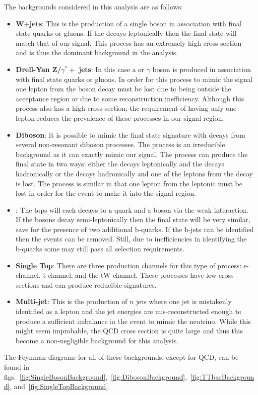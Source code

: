 The backgrounds considered in this analysis are as follows:
\begin{itemize}
	\item \textbf{W$+$jets}: This is the production of a single \Wpm boson in association with final state quarks or gluons. If the \Wpm decays leptonically then the final state will match that of our signal. This process has an extremely high cross section and is thus the dominant background in the analysis.
	\item \textbf{Drell-Yan Z/$\gamma^{*}+$ jets}: In this case a \Z or $\gamma$ boson is produced in association with final state quarks or gluons. In order for this process to mimic the signal one lepton from the boson decay must be lost due to being outside the acceptance region or due to some reconstruction inefficiency. Although this process also has a high cross section, the requirement of having only one lepton reduces the prevalence of these processes in our signal region.
	\item \textbf{Diboson}: It is possible to mimic the final state signature with decays from several non-resonant diboson processes. The \WW process is an irreducible background as it can exactly mimic our signal. The \WZ process can produce the \lvqq final state in two ways: either the \W decays leptonically and the \Z decays hadronically or the \W decays hadronically and one of the leptons from the \Z decay is lost. The \ZZ process is similar in that one lepton from the leptonic \Z must be lost in order for the event to make it into the signal region.
	\item \textbf{\ttbar}: The tops will each decays to a \cPqb quark and a \W boson via the weak interaction. If the \W bosons decay semi-leptonically then the final state will be very similar, save for the presence of two additional b-quarks. If the b-jets can be identified then the events can be removed. Still, due to inefficiencies in identifying the b-quarks some \ttbar may still pass all selection requirements.
	\item \textbf{Single Top}: There are three production channels for this type of process: s-channel, t-channel, and the tW-channel. These processes have low cross sections and can produce reducible signatures.
	\item \textbf{Multi-jet}: This is the production of $n$ jets where one jet is mistakenly identified as a lepton and the jet energies are mis-reconstructed enough to produce a sufficient imbalance in the event to mimic the neutrino. While this might seem improbable, the QCD cross section is quite large and thus this become a non-negligible background for this analysis.
\end{itemize}
The Feynman diagrams for all of these backgrounds, except for QCD, can be found in figs.~\ref{fig:SingleBosonBackground},~\ref{fig:DibosonBackground},~\ref{fig:TTbarBackground}, and~\ref{fig:SingleTopBackground}.


